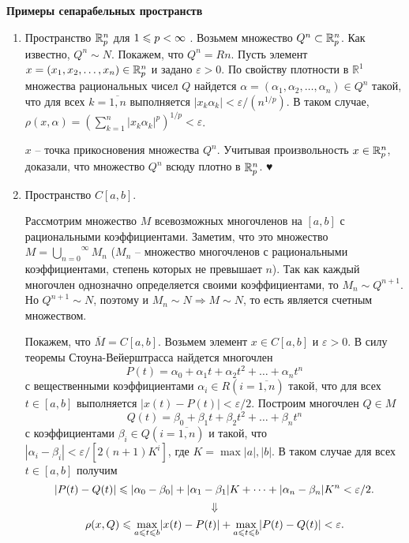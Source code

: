     \textbf{Примеры сепарабельных пространств}
    \begin{enumerate}
        \item Пространство $\mathbb{R}^n_p$ для  $1\leqslant  p < \infty$ . Возьмем множество $Q^n \subset \mathbb{R}^n_p$.
              Как известно, $Q^n \sim N$. Покажем, что $Q^n = Rn$.
              Пусть элемент $x = (x_1, x_2, \dots, x_n) \in \mathbb{R}^n_p$ и задано $\varepsilon > 0$.
              По свойству плотности в $\mathbb{R}^1$ множества рациональных чисел
              $Q$ найдется $\alpha = (\alpha_1, \alpha_2, \dots, \alpha_n) \in  Q^n$  такой,
              что для всех $k = \overline{1, n}$ выполняется $|x_k \alpha_k| < \varepsilon /(n^{1/p})$.
              В таком случае,
              $\rho(x, \alpha) =(\sum^n_{k=1}|x_k \alpha_k|^p)^{1/p}< \varepsilon $.

              \Rightarrow$x$ – точка прикосновения множества $Q^n$. Учитывая произвольность $x \in  \mathbb{R}^n_p$,
              доказали, что множество $Q^n$ всюду плотно в $\mathbb{R}^n_p$. ♥
        \item Пространство  $C[a, b]$.

              Рассмотрим множество $M$ всевозможных многочленов на $[a, b]$ с
              рациональными коэффициентами.
              Заметим, что это множество  $M = \stackrel{\infty}{\underset{n=0}{\bigcup}}M_n$
              ($M_n $ –  множество  многочленов с  рациональными коэффициентами, степень
              которых не превышает $n$).
              Так как каждый многочлен однозначно определяется своими коэффициентами,
              то $M_n \sim Q^{n+1}$. Но $Q^{n+1} \sim N$, поэтому и
              $M_n \sim N \Rightarrow M \sim N$, то есть является счетным множеством.

              Покажем, что $\overline{M} = C[a, b]$.
              Возьмем элемент $x \in  C[a, b]$ и $\varepsilon  > 0$. В силу теоремы
              Стоуна-Вейерштрасса найдется многочлен
              $$P (t) = \alpha_0 + \alpha_1 t + \alpha_2 t^2 + \dots + \alpha_n t^n$$
              с вещественными коэффициентами $\alpha_i \in  R  (i  =  \overline{1, n})$ такой, что для всех
              $t \in  [a, b]$ выполняется $|x(t) -P(t)| < \varepsilon /2$. Построим многочлен
              $ Q \in  M$
              $$ Q(t) = \beta_0 + \beta_1 t + \beta_2 t^2 + \dots + \beta_n t^n$$
              с коэффициентами $\beta_i  \in  Q  (i  =  \overline{1, n})$  и такой, что
              $|\alpha_i-\beta_i| < \varepsilon /[2(n + 1)K^i]$,
              где $K = \max{|a|, |b|}$. В таком случае для всех $t \in  [a, b]$ получим
              $$|P (t)- Q(t)| \leqslant |\alpha_0- \beta_0| + |\alpha_1- \beta_1|K + \dots
                  + |\alpha_n- \beta_n|K^n < \varepsilon /2.$$
              $$\Downarrow $$
              $$\rho(x, Q) \leqslant  \underset{a\leqslant t\leqslant b}{\max }|x(t)- P (t)|
                  + \underset{a\leqslant t\leqslant b}{\max} |P (t)- Q(t)| < \varepsilon .$$


\end{enumerate}
